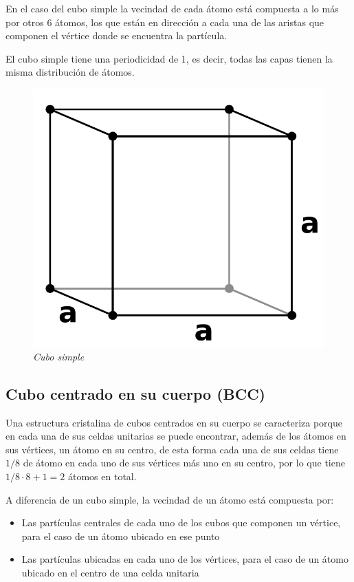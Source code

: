 En el caso del cubo simple la vecindad de cada átomo está compuesta a lo más por otros 6 átomos, los que están en dirección a cada una de las aristas que componen el vértice donde se encuentra la partícula.

El cubo simple tiene una periodicidad de 1, es decir, todas las capas tienen la misma distribución de átomos.

\begin{figure}[H]
  \centering
  \includegraphics[scale=.6]{images/SimpleCubic}
  \caption{\em Cubo simple}
\end{figure}


\subsection{Cubo centrado en su cuerpo (BCC)}
Una estructura cristalina de cubos centrados en su cuerpo se caracteriza porque en cada una de sus celdas unitarias se puede encontrar, además de los átomos en sus vértices, un átomo en su centro, de esta forma cada una de sus celdas tiene $1/8$ de átomo en cada uno de sus vértices más uno en su centro, por lo que tiene $1/8 \cdot 8 + 1 = 2$ átomos en total.

A diferencia de un cubo simple, la vecindad de un átomo está compuesta por:

\begin{itemize}
  \item Las partículas centrales de cada uno de los cubos que componen un vértice, para el caso de un átomo ubicado en ese punto
  \item Las partículas ubicadas en cada uno de los vértices, para el caso de un átomo ubicado en el centro de una celda unitaria
\end{itemize}

